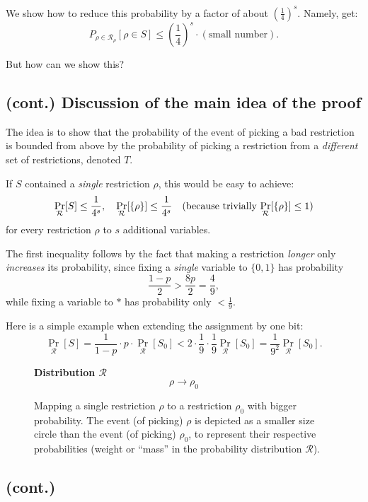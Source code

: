 We show how to reduce this probability by a factor of about \( \left( \frac{1}{4} \right)^s \).
Namely, get:
\[
P_{\rho \in \mathcal{R}_{\rho}}[\rho \in S] \leq \left( \frac{1}{4} \right)^s \cdot (\text{small number}).
\]

But how can we show this?

\subsection*{(cont.) Discussion of the main idea of the proof}

The idea is to show that the probability of the event of picking a bad restriction 
is bounded from above by the probability of picking a restriction from a \emph{different} 
set of restrictions, denoted \( T \).

If \( S \) contained a \emph{single} restriction \( \rho \), this would be easy to achieve:
\[
\Pr_{\mathcal{R}}[S] \leq \frac{1}{4^s}, \quad \Pr_{\mathcal{R}}[\{\rho\}] \leq \frac{1}{4^s} 
\quad \text{(because trivially \( \Pr_{\mathcal{R}}[\{\rho\}] \leq 1\))}
\]
for every restriction \( \rho \) to \( s \) additional variables.

The first inequality follows by the fact that making a restriction \emph{longer} 
only \emph{increases} its probability, since fixing a \emph{single} variable 
to \( \{0,1\} \) has probability 
\[
\frac{1 - p}{2} > \frac{8p}{2} = \frac{4}{9},
\]
while fixing a variable to \( * \) has probability only \( < \frac{1}{9} \).

Here is a simple example when extending the assignment by one bit:
\[
\Pr_{\mathcal{R}}[S] = \frac{1}{1 - p} \cdot p \cdot \Pr_{\mathcal{R}}[S_0] 
< 2 \cdot \frac{1}{9} \cdot \frac{1}{9} \Pr_{\mathcal{R}}[S_0] 
= \frac{1}{9^2} \Pr_{\mathcal{R}}[S_0].
\]

\begin{figure}
\centering
\textbf{Distribution \( \mathcal{R} \)}
\[
\rho \longrightarrow \rho_0
\]
\caption{Mapping a single restriction \( \rho \) to a restriction \( \rho_0 \) with bigger probability.
The event (of picking) \( \rho \) is depicted as a smaller size circle than the event (of picking) \( \rho_0 \),
to represent their respective probabilities (weight or ``mass'' in the probability distribution \( \mathcal{R} \)).}
\end{figure}

\subsection*{(cont.)}

